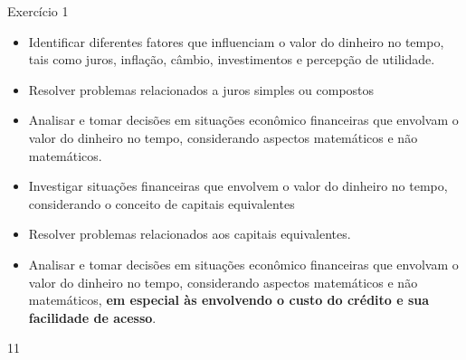 \def\currentcolor{cor1}
\begin{objectives}{Exercício 1}
{
\begin{itemize}
\item Identificar diferentes fatores que influenciam o valor do dinheiro no tempo, tais como juros, inflação, câmbio, investimentos e percepção de utilidade.
\item Resolver problemas relacionados a juros simples ou compostos
\item Analisar e tomar decisões em situações econômico financeiras que envolvam o valor do dinheiro no tempo, considerando aspectos matemáticos e não matemáticos.
\end{itemize}
\begin{itemize}
\item Investigar situações financeiras que envolvem o valor do dinheiro no tempo, considerando o conceito de capitais equivalentes 
\item Resolver problemas relacionados aos capitais equivalentes.
\item Analisar e tomar decisões em situações econômico financeiras que envolvam o valor do dinheiro no tempo, considerando aspectos matemáticos e não matemáticos, \textbf{em especial às envolvendo o custo do crédito e sua facilidade de acesso}.
\end{itemize}
}{1}{1}
\end{objectives}

